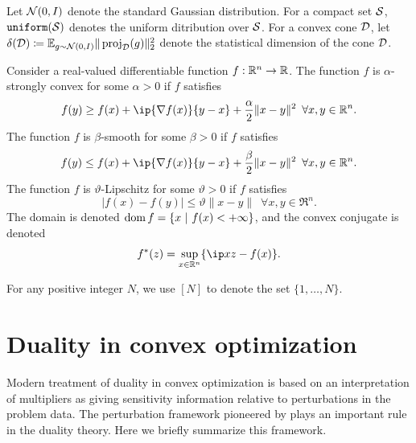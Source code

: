 Let $\mathcal{N}(0,I)$ denote the standard Gaussian distribution. For a compact set $\mathcal{S}$, $\operatorname{\texttt{uniform}}(\mathcal{S})$ denotes the uniform ditribution over $\mathcal{S}$. For a convex cone $\mathcal{D}$, let $\delta(\mathcal{D}) \coloneqq \mathbb{E}_{g\sim\mathcal{N}(0,I)} \|\operatorname{proj}_{\mathcal{D}}(g)\|_2^2 $ denote the statistical dimension of the cone $\mathcal{D}$.

Consider a real-valued differentiable function $f:\mathbb{R}^n\to\mathbb{R}$. The function $f$ is $\alpha$-strongly convex for some $\alpha>0$ if $f$ satisfies
\[f(y) \geq f(x) + \ip{\nabla f(x)}{y-x} + \frac{\alpha}{2}\|x-y\|^2 \enspace \forall x, y \in \Re^n.\]
The function $f$ is $\beta$-smooth for some $\beta>0$ if $f$ satisfies
\[f(y) \leq f(x) + \ip{\nabla f(x)}{y-x} + \frac{\beta}{2}\|x-y\|^2 \enspace \forall x, y \in \Re^n.\]
The function $f$ is $\vartheta$-Lipschitz for some $\vartheta>0$ if $f$ satisfies
\[|f(x) - f(y)| \leq \vartheta\|x-y\| \enspace \forall x, y \in \Re^n.\]
The domain is denoted
$\operatorname{dom} f = \{x~|~f(x)<+\infty\}$, and the convex conjugate is denoted
\[
  f^*(z) = \sup_{x\in\Re^n}\{\ip x z - f(x) \}.
\] 

For any positive integer $N$, we use $[N]$ to denote the set $\{1, \dots, N\}$. 


\section{Duality in convex optimization} \label{sec:1-2}

Modern treatment of duality in convex optimization is based on an interpretation of multipliers as giving sensitivity information relative to perturbations in the problem data. The perturbation framework pioneered by \citet{rockafellar1970convex} plays an important rule in the duality theory. Here we briefly summarize this framework. 

